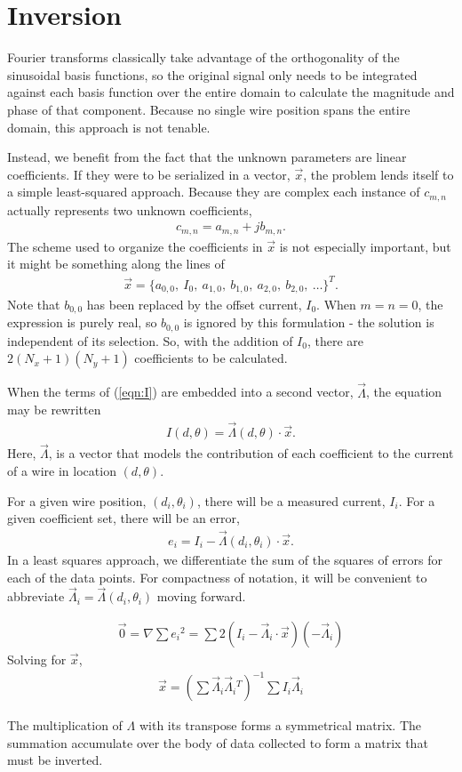 \documentclass{article}
\begin{document}
\section{Inversion}

Fourier transforms classically take advantage of the orthogonality of the sinusoidal basis functions, so the original signal only needs to be integrated against each basis function over the entire domain to calculate the magnitude and phase of that component.  Because no single wire position spans the entire domain, this approach is not tenable.

Instead, we benefit from the fact that the unknown parameters are linear coefficients.  If they were to be serialized in a vector, $\vec{x}$, the problem lends itself to a simple least-squared approach.  Because they are complex each instance of $c_{m,n}$ actually represents two unknown coefficients,
\begin{align}
c_{m,n} = a_{m,n} + j b_{m,n}.
\end{align}
The scheme used to organize the coefficients in $\vec{x}$ is not especially important, but it might be something along the lines of 
\begin{align}
\vec{x} = \{a_{0,0},\ I_0,\ a_{1,0},\ b_{1,0},\ a_{2,0},\ b_{2,0},\ \ldots \}^T.
\end{align}
Note that $b_{0,0}$ has been replaced by the offset current, $I_0$.  When $m=n=0$, the expression is purely real, so $b_{0,0}$ is ignored by this formulation - the solution is independent of its selection.  So, with the addition of $I_0$, there are $2(N_x+1)(N_y+1)$ coefficients to be calculated.

When the terms of (\ref{eqn:I}) are embedded into a second vector, $\vec{\Lambda}$, the equation may be rewritten
\begin{align}
I(d,\theta) = \vec{\Lambda}(d,\theta) \cdot \vec{x}.
\end{align}
Here, $\vec{\Lambda}$, is a vector that models the contribution of each coefficient to the current of a wire in location $(d,\theta)$.

For a given wire position, $(d_i, \theta_i)$, there will be a measured current, $I_i$.  For a given coefficient set, there will be an error,
\begin{align}
e_i = I_i - \vec{\Lambda}(d_i, \theta_i) \cdot \vec{x}.
\end{align}
In a least squares approach, we differentiate the sum of the squares of errors for each of the data points.  For compactness of notation, it will be convenient to abbreviate $\vec{\Lambda}_i = \vec{\Lambda}(d_i, \theta_i)$ moving forward.

\begin{align}
\vec{0} = \nabla \sum e_i {^2} = \sum 2(I_i - \vec{\Lambda}_i \cdot \vec{x})(- \vec{\Lambda}_i)
\end{align}
Solving for $\vec{x}$,
\begin{align}
\vec{x} = \left(\sum \vec{\Lambda}_i \vec{\Lambda}_i{^T}\right)^{-1} \sum I_i \vec{\Lambda}_i
\end{align}

The multiplication of $\Lambda$ with its transpose forms a symmetrical matrix.  The summation accumulate over the body of data collected to form a matrix that must be inverted.
\end{document}

